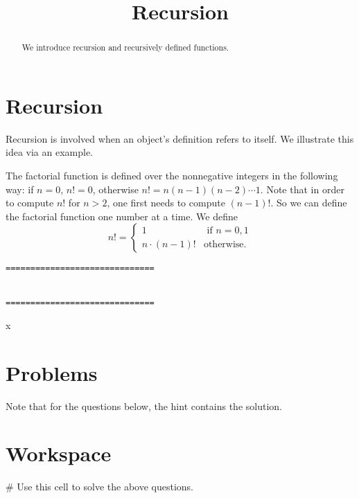 \documentclass{ximera}
\title{Recursion}
\begin{document}
  
\begin{abstract}  
We introduce recursion and recursively defined functions.
\end{abstract}  
\maketitle

\section{Recursion}

Recursion is involved when an object's definition refers to itself. We illustrate this idea via an example.

The factorial function is defined over the nonnegative integers in the following way: if $n=0$, $n!=0$, otherwise $n!=n(n-1)(n-2)\cdots 1$. Note that in order to compute $n!$ for $n>2$, one first needs to compute $(n-1)!$. So we can define the factorial function one number at a time. We define $$n!=\begin{cases} 1 & \text{ if $n=0,1$}\\ n\cdot(n-1)! & \text{otherwise.}\end{cases}$$



\begin{verbatim}
==============================


==============================
\end{verbatim}


\begin{sageCell}
x
\end{sageCell}

\section{Problems}

Note that for the questions below, the hint contains the solution.

\section{Workspace}

\begin{sageCell}
# Use this cell to solve the above questions.
\end{sageCell}
\end{document}
